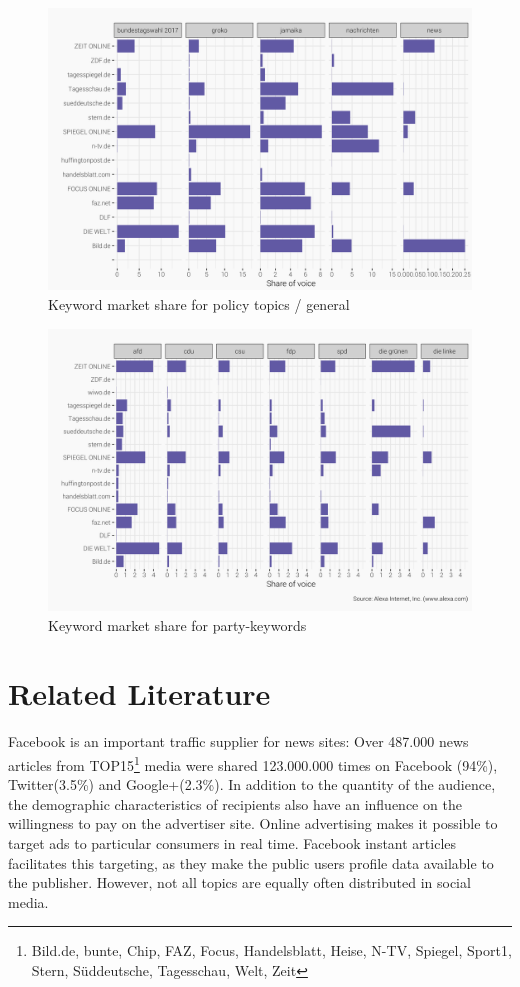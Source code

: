 \documentclass[12pt,a4paper,notitlepage]{article}
\begin{document}
\begin{figure}[H]
	\begin{center}
			\includegraphics[width=.8\textwidth]{../figs/keywords1.png}
			\caption{Keyword market share for policy topics / general}
			\label{fig_keywords1}
	\end{center}
\end{figure}

\begin{figure}[H]
	\begin{center}
			\includegraphics[width=.8\textwidth]{../figs/keywords2.png}
			\caption{Keyword market share for party-keywords}
			\label{fig_keywords2}
	\end{center}
\end{figure}


\section{Related Literature}


Facebook is an important traffic supplier for news sites: Over 487.000 news articles from TOP15\footnote{Bild.de, bunte, Chip, FAZ, Focus, Handelsblatt, Heise, N-TV, Spiegel, Sport1, Stern, Süddeutsche, Tagesschau, Welt, Zeit} media were shared 123.000.000 times on Facebook (94\%), Twitter(3.5\%) and Google+(2.3\%).\cite{schiller_development_2016} In addition to the quantity of the audience, the demographic characteristics of recipients also have an influence on the willingness to pay on the advertiser site. Online advertising makes it possible to target ads to particular consumers in real time. Facebook instant articles facilitates this targeting, as they make the public users profile data available to the publisher. However, not all topics are equally often distributed in social media.
\end{document}
